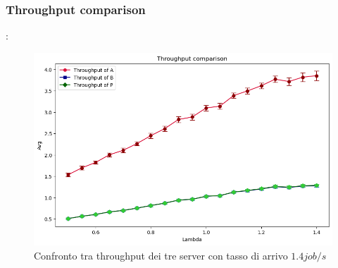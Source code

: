 \subsubsection{Throughput comparison}
\begin{frame}{\subsecname: \subsubsecname}
    \begin{figure}
        \centering
        \includegraphics[width=0.75\linewidth]{figs/results/obj4/obj4-throughput-comparison.png}
        \caption{Confronto tra throughput dei tre server con tasso di arrivo $1.4 job/s$}
        \label{fig:enter-label}
    \end{figure}
\end{frame}

